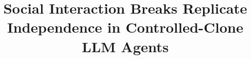 \documentclass{article}
\title{Social Interaction Breaks Replicate Independence in Controlled-Clone LLM Agents}
\begin{document}
\maketitle







\label{main-text-end}
\clearpage



\clearpage
\appendix

\clearpage

\end{document}

